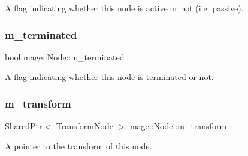 A flag indicating whether this node is active or not (i.\+e. passive). \hypertarget{classmage_1_1_node_aefb6986428c3dc24540af824a230b61d}{}\label{classmage_1_1_node_aefb6986428c3dc24540af824a230b61d} 
\subsubsection{\texorpdfstring{m\+\_\+terminated}{m\_terminated}}
{\footnotesize\ttfamily bool mage\+::\+Node\+::m\+\_\+terminated\hspace{0.3cm}{\ttfamily [private]}}

A flag indicating whether this node is terminated or not. \hypertarget{classmage_1_1_node_a0b8161cc8480dcd9340309c3773c49f2}{}\label{classmage_1_1_node_a0b8161cc8480dcd9340309c3773c49f2} 
\subsubsection{\texorpdfstring{m\+\_\+transform}{m\_transform}}
{\footnotesize\ttfamily \hyperlink{namespacemage_a1e01ae66713838a7a67d30e44c67703e}{Shared\+Ptr}$<$ Transform\+Node $>$ mage\+::\+Node\+::m\+\_\+transform\hspace{0.3cm}{\ttfamily [private]}}

A pointer to the transform of this node. 